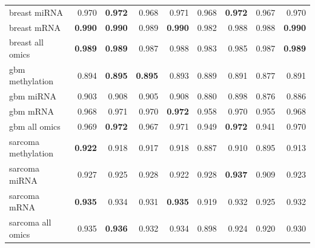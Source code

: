 \begin{tabular}{lrrrrrrrr}
breast miRNA & 0.970 & \textbf{0.972} & 0.968 & 0.971 & 0.968 & \textbf{0.972} & 0.967 & 0.970 \\
breast mRNA & \textbf{0.990} & \textbf{0.990} & 0.989 & \textbf{0.990} & 0.982 & 0.988 & 0.988 & \textbf{0.990} \\
breast all omics & \textbf{0.989} & \textbf{0.989} & 0.987 & 0.988 & 0.983 & 0.985 & 0.987 & \textbf{0.989} \\
gbm methylation & 0.894 & \textbf{0.895} & \textbf{0.895} & 0.893 & 0.889 & 0.891 & 0.877 & 0.891 \\
gbm miRNA & 0.903 & 0.908 & 0.905 & 0.908 & 0.880 & 0.898 & 0.876 & 0.886 \\
gbm mRNA & 0.968 & 0.971 & 0.970 & \textbf{0.972} & 0.958 & 0.970 & 0.955 & 0.968 \\
gbm all omics & 0.969 & \textbf{0.972} & 0.967 & 0.971 & 0.949 & \textbf{0.972} & 0.941 & 0.970 \\
sarcoma methylation & \textbf{0.922} & 0.918 & 0.917 & 0.918 & 0.887 & 0.910 & 0.895 & 0.913 \\
sarcoma miRNA & 0.927 & 0.925 & 0.928 & 0.922 & 0.928 & \textbf{0.937} & 0.909 & 0.923 \\
sarcoma mRNA & \textbf{0.935} & 0.934 & 0.931 & \textbf{0.935} & 0.919 & 0.932 & 0.925 & 0.932 \\
sarcoma all omics & 0.935 & \textbf{0.936} & 0.932 & 0.934 & 0.898 & 0.924 & 0.920 & 0.930 \\
\bottomrule
\end{tabular}
